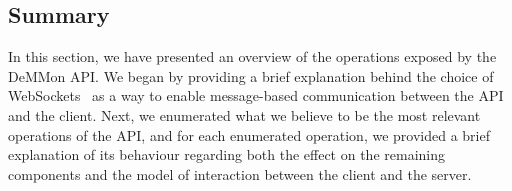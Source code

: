



\subsection{Summary}

In this section, we have presented an overview of the operations exposed by the DeMMon API. We began by providing a brief explanation behind the choice of WebSockets~\cite{websocketsRFC} as a way to enable message-based communication between the API and the client. Next, we enumerated what we believe to be the most relevant operations of the API, and for each enumerated operation, we provided a brief explanation of its behaviour regarding both the effect on the remaining components and the model of interaction between the client and the server. 